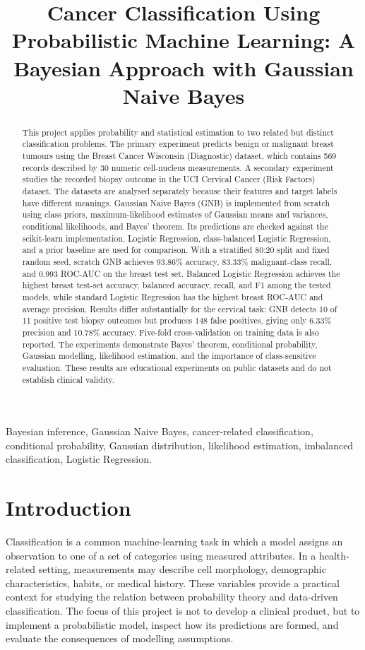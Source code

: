 \documentclass[conference]{IEEEtran}
\title{Cancer Classification Using Probabilistic Machine Learning: A Bayesian Approach with Gaussian Naive Bayes}
\author{\IEEEauthorblockN{Ojas Kumar Kashyap and Iraban Bhattacharya}
\IEEEauthorblockA{School of Computer Science and Engineering, Vellore Institute of Technology, Vellore, India\\
Probability and Statistics (BAMAT207), Track 6: AI, Machine Learning and Probability\\
}}
\begin{document}
\maketitle

\begin{abstract}
This project applies probability and statistical estimation to two related but distinct classification problems. The primary experiment predicts benign or malignant breast tumours using the Breast Cancer Wisconsin (Diagnostic) dataset, which contains 569 records described by 30 numeric cell-nucleus measurements. A secondary experiment studies the recorded biopsy outcome in the UCI Cervical Cancer (Risk Factors) dataset. The datasets are analysed separately because their features and target labels have different meanings. Gaussian Naive Bayes (GNB) is implemented from scratch using class priors, maximum-likelihood estimates of Gaussian means and variances, conditional likelihoods, and Bayes' theorem. Its predictions are checked against the scikit-learn implementation. Logistic Regression, class-balanced Logistic Regression, and a prior baseline are used for comparison. With a stratified 80:20 split and fixed random seed, scratch GNB achieves 93.86\% accuracy, 83.33\% malignant-class recall, and 0.993 ROC-AUC on the breast test set. Balanced Logistic Regression achieves the highest breast test-set accuracy, balanced accuracy, recall, and F1 among the tested models, while standard Logistic Regression has the highest breast ROC-AUC and average precision. Results differ substantially for the cervical task: GNB detects 10 of 11 positive test biopsy outcomes but produces 148 false positives, giving only 6.33\% precision and 10.78\% accuracy. Five-fold cross-validation on training data is also reported. The experiments demonstrate Bayes' theorem, conditional probability, Gaussian modelling, likelihood estimation, and the importance of class-sensitive evaluation. These results are educational experiments on public datasets and do not establish clinical validity.
\end{abstract}

\begin{IEEEkeywords}
Bayesian inference, Gaussian Naive Bayes, cancer-related classification, conditional probability, Gaussian distribution, likelihood estimation, imbalanced classification, Logistic Regression.
\end{IEEEkeywords}

\section{Introduction}
Classification is a common machine-learning task in which a model assigns an observation to one of a set of categories using measured attributes. In a health-related setting, measurements may describe cell morphology, demographic characteristics, habits, or medical history. These variables provide a practical context for studying the relation between probability theory and data-driven classification. The focus of this project is not to develop a clinical product, but to implement a probabilistic model, inspect how its predictions are formed, and evaluate the consequences of modelling assumptions.
\end{document}
